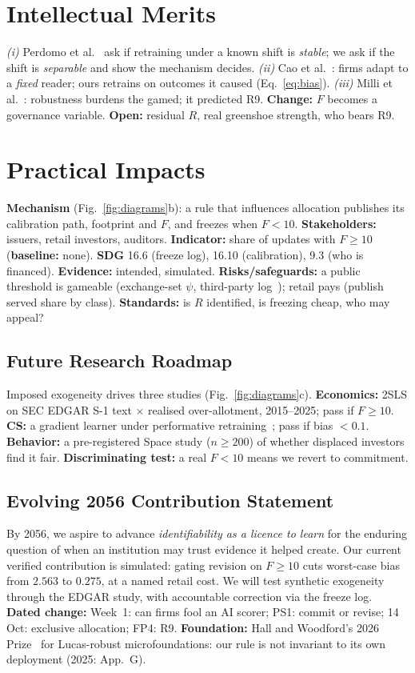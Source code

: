 \section{Intellectual Merits}
\emph{(i)} Perdomo et al.~\cite{perdomo2020} ask if retraining under a known shift is \emph{stable}; we ask if the shift is \emph{separable} and show the mechanism decides. \emph{(ii)} Cao et al.~\cite{cao2023machine}: firms adapt to a \emph{fixed} reader; ours retrains on outcomes it caused (Eq.~\eqref{eq:bias}). \emph{(iii)} Milli et al.~\cite{milli2019}: robustness burdens the gamed; it predicted R9. \textbf{Change:} $F$ becomes a governance variable. \textbf{Open:} residual $R$, real greenshoe strength, who bears R9.

\section{Practical Impacts}
\textbf{Mechanism} (Fig.~\ref{fig:diagrams}b): a rule that influences allocation publishes its calibration path, footprint and $F$, and freezes when $F<10$. \textbf{Stakeholders:} issuers, retail investors, auditors. \textbf{Indicator:} share of updates with $F\ge10$ (\textbf{baseline:} none). \textbf{SDG} 16.6 (freeze log), 16.10 (calibration), 9.3 (who is financed). \textbf{Evidence:} intended, simulated. \textbf{Risks/safeguards:} a public threshold is gameable (exchange-set $\psi$, third-party log~\cite{raji2020}); retail pays (publish served share by class). \textbf{Standards:} is $R$ identified, is freezing cheap, who may appeal?

\subsection*{Future Research Roadmap}
Imposed exogeneity drives three studies (Fig.~\ref{fig:diagrams}c). \textbf{Economics:} 2SLS on SEC EDGAR S-1 text $\times$ realised over-allotment, 2015--2025; pass if $F\ge10$. \textbf{CS:} a gradient learner under performative retraining~\cite{perdomo2020}; pass if bias $<0.1$. \textbf{Behavior:} a pre-registered Space study ($n\ge200$) of whether displaced investors find it fair. \textbf{Discriminating test:} a real $F<10$ means we revert to commitment.

\subsection*{Evolving 2056 Contribution Statement}
By 2056, we aspire to advance \emph{identifiability as a licence to learn} for the enduring question of when an institution may trust evidence it helped create. Our current verified contribution is simulated: gating revision on $F\ge10$ cuts worst-case bias from $2.563$ to $0.275$, at a named retail cost. We will test synthetic exogeneity through the EDGAR study, with accountable correction via the freeze log. \textbf{Dated change:} Week~1: can firms fool an AI scorer; PS1: commit or revise; 14 Oct: exclusive allocation; FP4: R9. \textbf{Foundation:} Hall and Woodford's 2026 Prize~\cite{nobel2026} for Lucas-robust microfoundations: our rule is not invariant to its own deployment (2025: App.~G).

